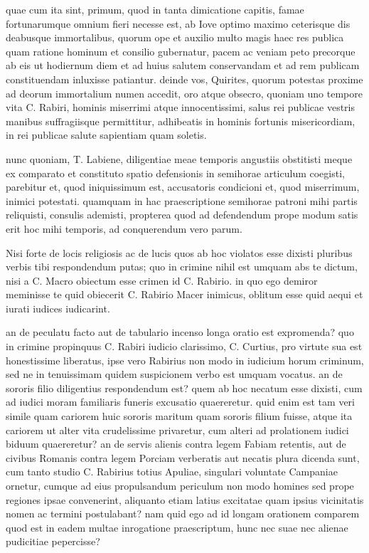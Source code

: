  quae cum ita sint, primum, quod in tanta dimicatione capitis, famae fortunarumque omnium fieri necesse est, ab Iove optimo maximo ceterisque dis deabusque immortalibus, quorum ope et auxilio multo magis haec res publica quam ratione hominum et consilio gubernatur, pacem ac veniam peto precorque ab eis ut hodiernum diem et ad huius salutem conservandam et ad rem publicam constituendam inluxisse patiantur. deinde vos, Quirites, quorum potestas proxime ad deorum immortalium numen accedit, oro atque obsecro, quoniam uno tempore vita C. Rabiri, hominis miserrimi atque innocentissimi, salus rei publicae vestris manibus suffragiisque permittitur, adhibeatis in hominis fortunis misericordiam, in rei publicae salute sapientiam quam soletis.

 nunc quoniam, T. Labiene, diligentiae meae temporis angustiis obstitisti meque ex comparato et constituto spatio defensionis in semihorae articulum coegisti, parebitur et, quod iniquissimum est, accusatoris condicioni et, quod miserrimum, inimici potestati. quamquam in hac praescriptione semihorae patroni mihi partis reliquisti, consulis ademisti, propterea quod ad defendendum prope modum satis erit hoc mihi temporis, ad conquerendum vero parum.

 Nisi forte de locis religiosis ac de lucis quos ab hoc violatos esse dixisti pluribus verbis tibi respondendum putas; quo in crimine nihil est umquam abs te dictum, nisi a C. Macro obiectum esse crimen id C. Rabirio. in quo ego demiror meminisse te quid obiecerit C. Rabirio Macer inimicus, oblitum esse quid aequi et iurati iudices iudicarint.

 an de peculatu facto aut de tabulario incenso longa oratio est expromenda? quo in crimine propinquus C. Rabiri iudicio clarissimo, C. Curtius, pro virtute sua est honestissime liberatus, ipse vero Rabirius non modo in iudicium horum criminum, sed ne in tenuissimam quidem suspicionem verbo est umquam vocatus. an de sororis filio diligentius respondendum est? quem ab hoc necatum esse dixisti, cum ad iudici moram familiaris funeris excusatio quaereretur. quid enim est tam veri simile quam cariorem huic sororis maritum quam sororis filium fuisse, atque ita cariorem ut alter vita crudelissime privaretur, cum alteri ad prolationem iudici biduum quaereretur? an de servis alienis contra legem Fabiam retentis, aut de civibus Romanis contra legem Porciam verberatis aut necatis plura dicenda sunt, cum tanto studio C. Rabirius totius Apuliae, singulari voluntate Campaniae ornetur, cumque ad eius propulsandum periculum non modo homines sed prope regiones ipsae convenerint, aliquanto etiam latius excitatae quam ipsius vicinitatis nomen ac termini postulabant? nam quid ego ad id longam orationem comparem quod est in eadem multae inrogatione praescriptum, hunc nec suae nec alienae pudicitiae pepercisse?

